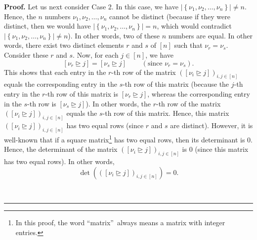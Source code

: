 \documentclass
[numbers=enddot,12pt,final,onecolumn,notitlepage,english]{scrartcl}%
\theoremstyle{definition}
\newenvironment{proof}[1][Proof]{\noindent\textbf{#1.} }{\ \rule{0.5em}{0.5em}}
\newenvironment{verlong}{}{}
\begin{document}
\begin{proof}
\begin{verlong}
Let us next consider Case 2. In this case, we have $\left\vert \left\{
\nu_{1},\nu_{2},\ldots,\nu_{n}\right\}  \right\vert \neq n$. Hence, the $n$
numbers $\nu_{1},\nu_{2},\ldots,\nu_{n}$ cannot be distinct (because if they
were distinct, then we would have $\left\vert \left\{  \nu_{1},\nu_{2}%
,\ldots,\nu_{n}\right\}  \right\vert =n$, which would contradict $\left\vert
\left\{  \nu_{1},\nu_{2},\ldots,\nu_{n}\right\}  \right\vert \neq n$). In
other words, two of these $n$ numbers are equal. In other words, there exist
two distinct elements $r$ and $s$ of $\left[  n\right]  $ such that $\nu
_{r}=\nu_{s}$. Consider these $r$ and $s$. Now, for each $j\in\left[
n\right]  $, we have%
\[
\left[  \nu_{r}\trianglerighteq j\right]  =\left[  \nu_{s}\trianglerighteq
j\right]  \ \ \ \ \ \ \ \ \ \ \left(  \text{since }\nu_{r}=\nu_{s}\right)  .
\]
This shows that each entry in the $r$-th row of the matrix $\left(  \left[
\nu_{i}\trianglerighteq j\right]  \right)  _{i,j\in\left[  n\right]  }$ equals
the corresponding entry in the $s$-th row of this matrix (because the $j$-th
entry in the $r$-th row of this matrix is $\left[  \nu_{r}\trianglerighteq
j\right]  $, whereas the corresponding entry in the $s$-th row is $\left[
\nu_{s}\trianglerighteq j\right]  $). In other words, the $r$-th row of the
matrix $\left(  \left[  \nu_{i}\trianglerighteq j\right]  \right)
_{i,j\in\left[  n\right]  }$ equals the $s$-th row of this matrix. Hence, this
matrix $\left(  \left[  \nu_{i}\trianglerighteq j\right]  \right)
_{i,j\in\left[  n\right]  }$ has two equal rows (since $r$ and $s$ are
distinct). However, it is well-known that if a square matrix\footnote{In this
proof, the word \textquotedblleft matrix\textquotedblright\ always means a
matrix with integer entries.} has two equal rows, then its determinant is $0$.
Hence, the determinant of the matrix $\left(  \left[  \nu_{i}\trianglerighteq
j\right]  \right)  _{i,j\in\left[  n\right]  }$ is $0$ (since this matrix has
two equal rows). In other words,
\begin{equation}
\det\left(  \left(  \left[  \nu_{i}\trianglerighteq j\right]  \right)
_{i,j\in\left[  n\right]  }\right)  =0. \label{pf.lem.xi-det.c2.det=0}%
\end{equation}



\end{verlong}
\end{proof}
\end{document}
